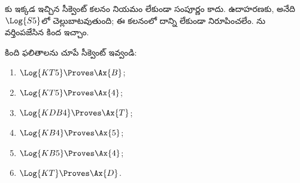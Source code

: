 \documentclass[../../../include/open-logic-section]{subfiles}
\begin{document}
\begin{ex}
కు ఇక్కడ ఇచ్చిన సీక్వెంట్ కలనం \Cut{} నియమం
లేకుండా సంపూర్ణం కాదు. ఉదాహరణకు,
 అనేది~$\Log{S5}$లో చెల్లుబాటవుతుంది;
ఈ కలనంలో దాన్ని \Cut{} లేకుండా నిరూపించలేం. \Cut{}ను
వర్తింపజేసిన  కింద ఇచ్చాం.
\begin{prooftree}
\end{prooftree}
\end{ex}

\begin{prob}
కింది ఫలితాలను చూపే సీక్వెంట్
 ఇవ్వండి:
  \begin{enumerate}
  \item $\Log{KT5} \Proves \Ax{B}$;
  \item $\Log{KT5} \Proves \Ax{4}$;
  \item $\Log{KDB4} \Proves \Ax{T}$;
  \item $\Log{KB4} \Proves \Ax{5}$;
  \item $\Log{KB5} \Proves \Ax{4}$;
  \item $\Log{KT} \Proves \Ax{D}$.
  \end{enumerate}
\end{prob}
\end{document}
